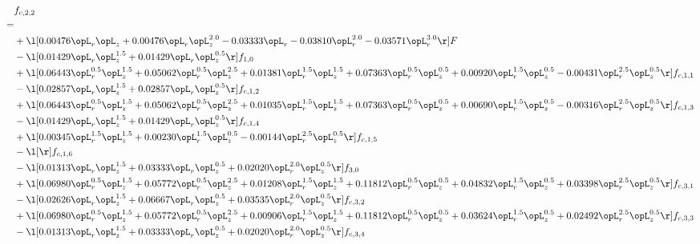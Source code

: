 \begin{alignat}{2} 
\label{eq:f_22_1} 
& f_{c,2,2} \nonumber \\ 
 = \\ 
& + \l[  0.00476 \opL_r \opL_z +  0.00476 \opL_r \opL_z^{2.0}   -0.03333 \opL_r   -0.03810 \opL_r^{2.0}   -0.03571 \opL_r^{3.0}  \r] F \nonumber \\ 
& - \l[  0.01429 \opL_r \opL_z^{1.5} +  0.01429 \opL_r \opL_z^{0.5}  \r] f_{1,0} \nonumber \\ 
& + \l[  0.06443 \opL_r^{0.5} \opL_z^{1.5} +  0.05062 \opL_r^{0.5} \opL_z^{2.5} +  0.01381 \opL_r^{1.5} \opL_z^{1.5} +  0.07363 \opL_r^{0.5} \opL_z^{0.5} +  0.00920 \opL_r^{1.5} \opL_z^{0.5}   -0.00431 \opL_r^{2.5} \opL_z^{0.5}  \r] f_{c,1,1} \nonumber \\ 
& - \l[  0.02857 \opL_r \opL_z^{1.5} +  0.02857 \opL_r \opL_z^{0.5}  \r] f_{c,1,2} \nonumber \\ 
& + \l[  0.06443 \opL_r^{0.5} \opL_z^{1.5} +  0.05062 \opL_r^{0.5} \opL_z^{2.5} +  0.01035 \opL_r^{1.5} \opL_z^{1.5} +  0.07363 \opL_r^{0.5} \opL_z^{0.5} +  0.00690 \opL_r^{1.5} \opL_z^{0.5}   -0.00316 \opL_r^{2.5} \opL_z^{0.5}  \r] f_{c,1,3} \nonumber \\ 
& - \l[  0.01429 \opL_r \opL_z^{1.5} +  0.01429 \opL_r \opL_z^{0.5}  \r] f_{c,1,4} \nonumber \\ 
& + \l[  0.00345 \opL_r^{1.5} \opL_z^{1.5} +  0.00230 \opL_r^{1.5} \opL_z^{0.5}   -0.00144 \opL_r^{2.5} \opL_z^{0.5}  \r] f_{c,1,5} \nonumber \\ 
& - \l[  \r] f_{c,1,6} \nonumber \\ 
& - \l[  0.01313 \opL_r \opL_z^{1.5} +  0.03333 \opL_r \opL_z^{0.5} +  0.02020 \opL_r^{2.0} \opL_z^{0.5}  \r] f_{3,0} \nonumber \\ 
& + \l[  0.06980 \opL_r^{0.5} \opL_z^{1.5} +  0.05772 \opL_r^{0.5} \opL_z^{2.5} +  0.01208 \opL_r^{1.5} \opL_z^{1.5} +  0.11812 \opL_r^{0.5} \opL_z^{0.5} +  0.04832 \opL_r^{1.5} \opL_z^{0.5} +  0.03398 \opL_r^{2.5} \opL_z^{0.5}  \r] f_{c,3,1} \nonumber \\ 
& - \l[  0.02626 \opL_r \opL_z^{1.5} +  0.06667 \opL_r \opL_z^{0.5} +  0.03535 \opL_r^{2.0} \opL_z^{0.5}  \r] f_{c,3,2} \nonumber \\ 
& + \l[  0.06980 \opL_r^{0.5} \opL_z^{1.5} +  0.05772 \opL_r^{0.5} \opL_z^{2.5} +  0.00906 \opL_r^{1.5} \opL_z^{1.5} +  0.11812 \opL_r^{0.5} \opL_z^{0.5} +  0.03624 \opL_r^{1.5} \opL_z^{0.5} +  0.02492 \opL_r^{2.5} \opL_z^{0.5}  \r] f_{c,3,3} \nonumber \\ 
& - \l[  0.01313 \opL_r \opL_z^{1.5} +  0.03333 \opL_r \opL_z^{0.5} +  0.02020 \opL_r^{2.0} \opL_z^{0.5}  \r] f_{c,3,4} \nonumber \\ 

\end{alignat}
